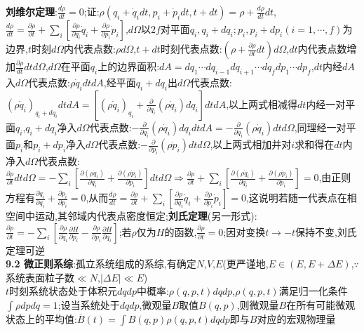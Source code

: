 \documentclass[10pt,a4paper]{article}
\begin{document}
\begin{multicols}{2}
\textbf{刘维尔定理}:$\frac{d\rho}{dt}=0$;证:$\rho(q_i+\dot{q}_idt,p_i+\dot{p}_idt,t+dt)=\rho+\frac{d\rho}{dt}dt$,$\frac{d\rho}{dt}=\frac{\partial\rho}{\partial t}+\sum_i\left[\frac{\partial\rho}{\partial q_i}\dot{q}_i+\frac{\partial\rho}{\partial p_i}\dot{p}_i\right]$,$d\Omega$以$2f$对平面$q_i,q_i+dq_i;p_i,p_i+dp_i(i=1,\cdots,f)$为边界,$t$时刻$d\Omega$内代表点数:$\rho d\Omega$,$t+dt$时刻代表点数:$\left(\rho+\frac{\partial\rho}{\partial t}dt\right)d\Omega$,$dt$内代表点数增加$\frac{\partial\rho}{dt}dtd\Omega$,$d\Omega$在平面$q_i$上的边界面积:$dA=dq_1\cdots dq_{i-1}dq_{i+1}\cdots dq_fdp_1\cdots dp_f$,$dt$内经$dA$入$d\Omega$代表点数:$\rho\dot{q}_idtdA$,经平面$q_i+dq_i$出$d\Omega$代表点数:$(\rho\dot{q}_i)_{q_i+dq_i}dtdA=\left[(\rho\dot{q}_i)_{q_i}+\frac{\partial}{\partial q_i}(\rho\dot{q}_i)dq_i\right]dtdA$,以上两式相减得$dt$内经一对平面$q_i$,$q_i+dq_i$净入$d\Omega$代表点数:$-\frac{\partial}{\partial q_i}(\rho\dot{q}_i)dq_idtdA=-\frac{\partial}{\partial q_i}(\rho\dot{q}_i)dtd\Omega$,同理经一对平面$p_i$和$p_i+dp_i$净入$d\Omega$代表点数:$-\frac{\partial}{\partial p_i}(\rho\dot{p}_i)dtd\Omega$,以上两式相加并对$i$求和得在$dt$内净入$d\Omega$代表点数:$\frac{\partial\rho}{\partial t}dtd\Omega=-\sum_i\left[\frac{\partial(\rho\dot{q}_i)}{\partial q_i}+\frac{\partial(\rho\dot{p}_i)}{\partial p_i}\right]dtd\Omega\Rightarrow\frac{\partial\rho}{\partial t}+\sum_i\left[\frac{\partial(\rho\dot{q}_i)}{\partial q_i}+\frac{\partial(\rho\dot{p}_i)}{\partial p_i}\right]=0$,由正则方程有$\frac{\partial\dot{q}_i}{\partial q_i}+\frac{\partial\dot{p}_i}{\partial p_i}=0$,从而$\frac{d\rho}{dt}=\frac{\partial\rho}{\partial t}+\sum_i\left[\frac{\partial\rho}{\partial q_i}\dot{q}_i+\frac{\partial\rho}{\partial p_i}\dot{p}_i\right]=0$,这说明若随一代表点在相空间中运动,其邻域内代表点密度恒定;\textbf{刘氏定理}(另一形式):$\frac{\partial\rho}{\partial t}=-\sum_i\left[\frac{\partial\rho}{\partial q_i}\frac{\partial H}{\partial p_i}-\frac{\partial\rho}{\partial p_i}\frac{\partial H}{\partial q_i}\right]$;若$\rho$仅为$H$的函数,$\frac{\partial\rho}{\partial t}=0$;因对变换$t\rightarrow-t$保持不变,刘氏定理可逆\\
\textbf{9.2 微正则系综}:孤立系统组成的系综,有确定$N$,$V$,$E$(更严谨地,$E\in(E,E+\Delta E)$,$\because$系统表面粒子数$\ll N$,$|\Delta E|\ll E$)\\
$t$时刻系统状态处于体积元$dqdp$中概率:$\rho(q,p,t)dqdp$,$\rho(q,p,t)$满足归一化条件$\int\rho dpdq=1$;设当系统处于$dqdp$,微观量$B$取值$B(q,p)$,则微观量$B$在所有可能微观状态上的平均值:$\overline{B}(t)=\int B(q,p)\rho(q,p,t)dqdp$即与$B$对应的宏观物理量\\

\end{multicols}
\end{document}
